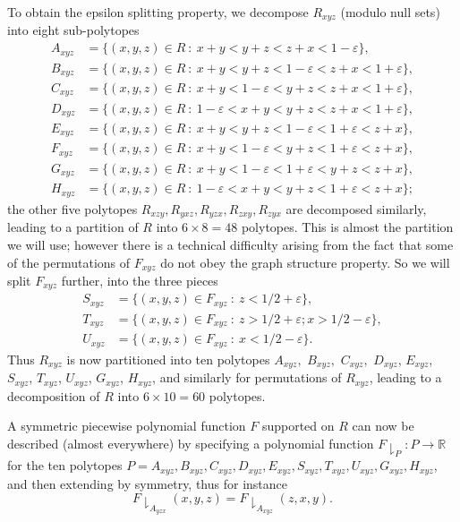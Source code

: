 \documentclass{bmcart}
\theoremstyle{plain}
\theoremstyle{definition}
\newcommand\R{\mathbb{R}}
\newcommand\eps{\varepsilon}
\begin{document}
To obtain the epsilon splitting property, we decompose $R_{xyz}$ (modulo null sets) into eight sub-polytopes
\begin{align*}
A_{xyz} & =\{(x,y,z)\in R\ :\ x+y< y+z< z+x< 1-\eps\},\\
B_{xyz} & =\{(x,y,z)\in R\ :\ x+y< y+z< 1-\eps< z+x< 1+\eps\},\\
C_{xyz} & =\{(x,y,z)\in R\ :\ x+y< 1-\eps < y+z < z+x< 1+\eps\},\\
D_{xyz} & =\{(x,y,z)\in R\ :\ 1-\eps < x+y<  y+z < z+x< 1+\eps\},\\
E_{xyz} & =\{(x,y,z)\in R\ :\ x+y< y+z< 1-\eps <  1+\eps < z+x\},\\
F_{xyz} & =\{(x,y,z)\in R\ :\ x+y< 1-\eps < y+z <  1+\eps < z+x\},\\
G_{xyz} & =\{(x,y,z)\in R\ :\ x+y< 1-\eps  <  1+\eps < y+z < z+x\},\\
H_{xyz} & =\{(x,y,z)\in R\ :\ 1-\eps < x+y<  y+z < 1+\eps < z+x\};
\end{align*}
the other five polytopes $R_{xzy}, R_{yxz}, R_{yzx}, R_{zxy}, R_{zyx}$ are decomposed similarly, leading to a partition of $R$ into $6 \times 8 = 48$ polytopes.
This is almost the partition we will use; however there is a technical difficulty arising from the fact that some of the permutations of $F_{xyz}$ do not obey the graph structure property.  So we will split $F_{xyz}$ further, into the three pieces
\begin{align*}
S_{xyz} & = \{(x,y,z)\in F_{xyz}\ :\ z< 1/2+\eps\},\\
T_{xyz} & = \{(x,y,z)\in F_{xyz}\ :\ z> 1/2+\eps;x> 1/2-\eps \}, \\
U_{xyz} & = \{(x,y,z)\in F_{xyz}\ :\ x< 1/2-\eps \}.
\end{align*}
Thus $R_{xyz}$ is now partitioned into ten polytopes $A_{xyz},$ $B_{xyz},$ $C_{xyz},$ $D_{xyz}$, $E_{xyz}$, $S_{xyz}$, $T_{xyz}$, $U_{xyz}$, $G_{xyz}$, $H_{xyz}$, and similarly for permutations of $R_{xyz}$, leading to a decomposition of $R$ into $6 \times 10 = 60$ polytopes.


A symmetric piecewise polynomial function $F$ supported on $R$ can now be described (almost everywhere) by specifying a polynomial function $F\downharpoonright_{P}: P \to \R$ for the ten polytopes $P = A_{xyz}, B_{xyz}, C_{xyz}, D_{xyz}, E_{xyz},  S_{xyz}, T_{xyz}, U_{xyz}, G_{xyz}, H_{xyz}$, and then extending by symmetry, thus for instance
$$ F\downharpoonright_{A_{yzx}}(x,y,z) = F\downharpoonright_{A_{xyz}}(z,x,y).$$
\end{document}
